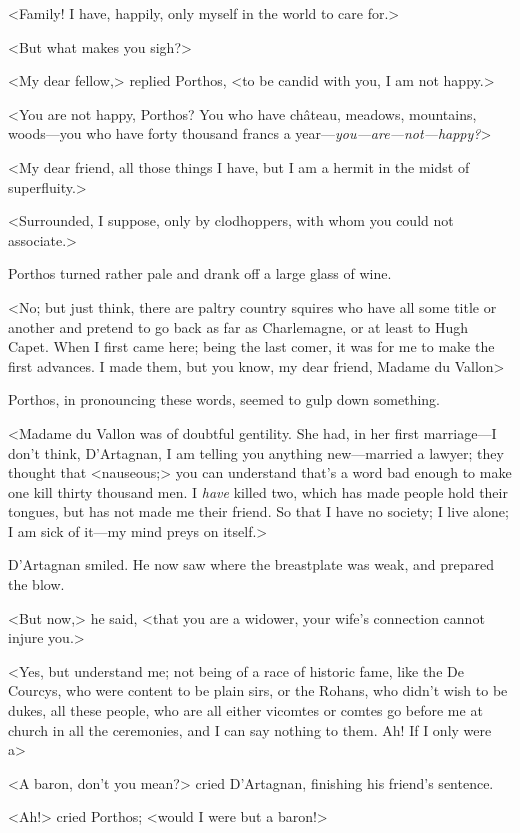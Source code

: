 <Family! I have, happily, only myself in the world to care for.>

<But what makes you sigh?>

<My dear fellow,> replied Porthos, <to be candid with you, I am not happy.>

<You are not happy, Porthos? You who have château, meadows, mountains, woods—you who have forty thousand francs a year—\emph{you—are—not—happy?}>

<My dear friend, all those things I have, but I am a hermit in the midst of superfluity.>

<Surrounded, I suppose, only by clodhoppers, with whom you could not associate.>

Porthos turned rather pale and drank off a large glass of wine.

<No; but just think, there are paltry country squires who have all some title or another and pretend to go back as far as Charlemagne, or at least to Hugh Capet. When I first came here; being the last comer, it was for me to make the first advances. I made them, but you know, my dear friend, Madame du Vallon\longdash>

Porthos, in pronouncing these words, seemed to gulp down something.

<Madame du Vallon was of doubtful gentility. She had, in her first marriage—I don't think, D'Artagnan, I am telling you anything new—married a lawyer; they thought that <nauseous;> you can understand that's a word bad enough to make one kill thirty thousand men. I \emph{have} killed two, which has made people hold their tongues, but has not made me their friend. So that I have no society; I live alone; I am sick of it—my mind preys on itself.>

D'Artagnan smiled. He now saw where the breastplate was weak, and prepared the blow.

<But now,> he said, <that you are a widower, your wife's connection cannot injure you.>

<Yes, but understand me; not being of a race of historic fame, like the De Courcys, who were content to be plain sirs, or the Rohans, who didn't wish to be dukes, all these people, who are all either vicomtes or comtes go before me at church in all the ceremonies, and I can say nothing to them. Ah! If I only were a\longdash>

<A baron, don't you mean?> cried D'Artagnan, finishing his friend's sentence.

<Ah!> cried Porthos; <would I were but a baron!>

